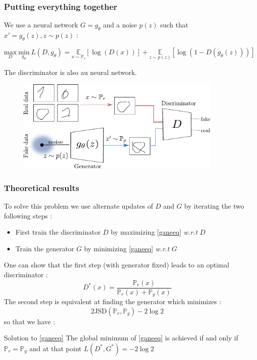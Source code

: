 \documentclass[french,9pt]{beamer}
\begin{document}
\begin{frame}

\frametitle{Putting everything together}

We use a neural network $G=g_{\theta}$ and a noise $p(z)$ such that $x'=g_{\theta}(z), z \sim p(z)$ :

\begin{equation}
\label{ganeeq}
\underset{D}{\text{max}} \ \underset{g_{\theta}}{\text{min}} \  L(D,g_{\theta}) = \underset{x \sim \mathbb{P}_{r}}{\mathbb{E}}[\log(D(x))]+ \underset{z \sim p(z)}{\mathbb{E}}[\log(1-D(g_{\theta}(z)))]
\end{equation}

The discriminator is also au neural network.

\begin{figure}
  \begin{center}
    \includegraphics[width=0.9\textwidth]{fig/gan.pdf}
  \end{center}
\end{figure}

\end{frame}

\begin{frame}
\frametitle{Theoretical results}

To solve this problem we use alternate updates of $D$ and $G$ by iterating the two following steps :
\begin{itemize}
\item First train the discriminator $D$ by maximizing \eqref{ganeeq} \textit{w.r.t} $D$
\item Train the generator $G$ by minimizing  \eqref{ganeeq} \textit{w.r.t} $G$
\end{itemize}

One can show that the first step (with generator fixed)  leads to an optimal discriminator : $$D^{*}(x)= \frac{\mathbb{P}_{r}(x)}{\mathbb{P}_{r}(x)+\mathbb{P}_{g}(x)}$$ 
The second step is equivalent at finding the generator which minimizes : 
\begin{equation}
\label{jsdeq}
2 \text{JSD}(\mathbb{P}_{r},\mathbb{P}_{g})-2\log 2 
\end{equation}
 so that we have :
 \begin{block}{Solution to \eqref{ganeeq}}
The global minimum of \eqref{ganeeq} is achieved if and only if $\mathbb{P}_{r}=\mathbb{P}_{g}$ and at that point  $L(D^{*},G^{*})=-2\log 2$
\end{block}

\end{frame}
\end{document}

